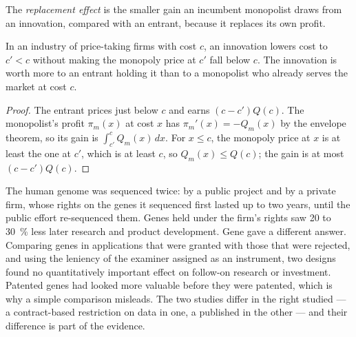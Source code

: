 \begin{definition}\label{def:b3:platforms-and-innovation:replacement}
The \emph{replacement effect} is the smaller gain an incumbent monopolist draws from an
innovation, compared with an entrant, because it replaces its own profit.
\end{definition}

\begin{proposition}\label{prop:b3:platforms-and-innovation:arrow}
In an industry of price-taking firms with cost $c$, an innovation lowers cost to $c' < c$ without
making the monopoly price at $c'$ fall below $c$. The innovation is worth more to an entrant
holding it than to a monopolist who already serves the market at cost $c$.
\end{proposition}

\begin{proof}
The entrant prices just below $c$ and earns $(c - c')Q(c)$. The monopolist's profit $\pi_m(x)$ at cost $x$ has $\pi_m'(x) = -Q_m(x)$ by
the envelope theorem, so its gain is $\int_{c'}^{c} Q_m(x)\,dx$. For $x \le c$, the monopoly price at $x$ is at least the one at $c'$,
which is at least $c$, so $Q_m(x) \le Q(c)$; the gain is at most $(c - c')Q(c)$.
\end{proof}

\begin{record}
The human genome was sequenced twice: by a public project and by a private firm,
whose rights on the genes it sequenced first lasted up to two years, until the
public effort re-sequenced them. Genes held under the firm's rights saw 20 to 30~\% less
later research and product development. %
Gene \emph{} gave a different answer. Comparing genes in  applications
that were granted with those that were rejected, and using the leniency of the
examiner assigned as an instrument, two designs found no quantitatively important
effect on follow-on research or investment. Patented genes had looked more valuable
before they were patented, which is why a simple comparison misleads. %
The two studies differ in the right studied --- a contract-based restriction on
data in one, a published  in the other --- and their difference is part of
the evidence.
\end{record}

